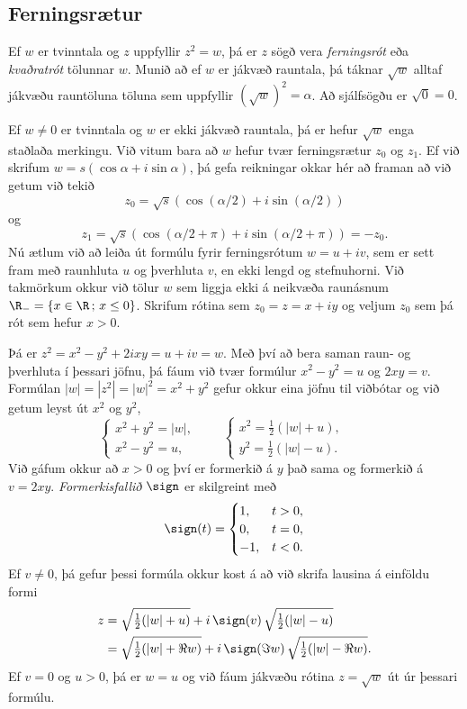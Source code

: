 \subsection*{Ferningsrætur}



Ef $w$ er tvinntala og $z$ uppfyllir $z^2=w$, þá er $z$ sögð vera
{\it ferningsrót} eða {\it kvaðratrót } tölunnar $w$.
Munið að ef $w$ er jákvæð rauntala, þá táknar $\sqrt w$ alltaf jákvæðu
rauntöluna  töluna sem uppfyllir $(\sqrt w)^2=\alpha$.  
Að sjálfsögðu er $\sqrt 0=0$.


Ef $w\neq 0$ er tvinntala og $w$ er ekki jákvæð rauntala, þá 
er hefur $\sqrt w$ enga staðlaða merkingu.  Við vitum bara að 
$w$ hefur tvær  ferningsrætur  $z_0$ og $z_1$.  Ef við skrifum 
$w=s(\cos \alpha+i\sin\alpha)$, þá gefa reikningar okkar hér að framan
að við getum við tekið
$$
z_0=\sqrt{s}(\cos(\alpha/2)+i\sin (\alpha/2))
$$
og
$$
z_1=\sqrt{s}(\cos(\alpha/2+\pi)+i\sin (\alpha/2+\pi))=-z_0.
$$  
Nú ætlum við að leiða út formúlu fyrir ferningsrótum  
$w=u+iv$, sem er sett fram með raunhluta $u$ og þverhluta $v$, en ekki
lengd og stefnuhorni.  Við takmörkum okkur við
tölur $w$ sem liggja ekki á neikvæða raunásnum $\R_-=\{x\in \R\,;\,
x\leq 0\}$.  Skrifum  rótina sem $z_0=z=x+iy$ og veljum $z_0$ sem þá
rót sem hefur $x>0$.  


Þá er $z^2=x^2-y^2+2ixy=u+iv=w$.  Með því að bera saman
raun- og þverhluta í þessari jöfnu, þá fáum við tvær
formúlur  $x^2-y^2=u$ og $2xy=v$.  Formúlan $|w|=|z^2|=|w|^2=x^2+y^2$
gefur okkur eina jöfnu til viðbótar og við getum leyst út $x^2$ og
$y^2$, 
$$
\begin{cases}
x^2+y^2=|w|,\\
x^2-y^2=u,
\end{cases}\qquad
\begin{cases}
x^2=\tfrac 12(|w|+u),\\
y^2=\tfrac 12(|w|-u).
\end{cases}\qquad
$$
Við gáfum okkur að $x>0$ og því  er formerkið á $y$ 
það sama og formerkið á $v=2xy$.   
{\it Formerkisfallið} $\sign$ er skilgreint með
$$
\sign(t)=
\begin{cases}
1, &t>0,\\
0, &t=0,\\
-1,&t<0.
\end{cases}
$$
Ef $v\neq 0$, þá  gefur þessi  formúla okkur kost á að  við 
skrifa lausina á einföldu formi
\begin{align*}
z&=\sqrt{\tfrac 12(|w|+u)}+i\, \sign(v)\, \sqrt{\tfrac 12(|w|-u)}\\
&=\sqrt{\tfrac 12(|w|+\Re w)}+i\, \sign(\Im w)\, \sqrt{\tfrac
12(|w|-\Re w)}.
\end{align*}
Ef $v=0$ og $u>0$, þá er $w=u$ og við fáum jákvæðu rótina
$z=\sqrt w$ út úr þessari formúlu.




